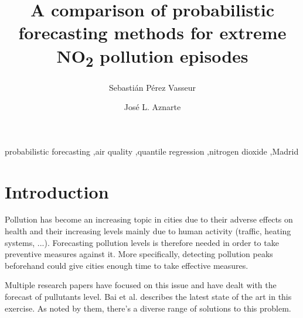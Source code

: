 \documentclass[a4paper,twocolumn,5p]{elsarticle}
\begin{document}
\newcommand{\no}{NO\textsubscript{2}\xspace}

\begin{frontmatter}

\title{A comparison of probabilistic forecasting methods for extreme \no pollution episodes}

\author{Sebasti\'an P\'erez Vasseur} 
\address{Artificial Intelligence Department\\Universidad Nacional de
  Educaci\'on a Distancia --- UNED\\c/ Juan del Rosal, 16, Madrid, Spain}

\author{Jos\'e L. Aznarte}
\address{Artificial Intelligence Department\\Universidad Nacional de
  Educaci\'on a Distancia --- UNED\\c/ Juan del Rosal, 16, Madrid, Spain}



\begin{abstract}

\end{abstract}

\begin{keyword}
probabilistic forecasting \sep air quality \sep quantile regression
\sep nitrogen dioxide \sep Madrid
\end{keyword}

\end{frontmatter}


\section{Introduction}
\label{sec:intro}

Pollution has become an increasing topic in cities due to their adverse 
effects on health and their increasing levels mainly due to human activity 
(traffic, heating systems, ...). Forecasting pollution levels is therefore needed 
in order to take preventive measures against it. More specifically, detecting pollution 
peaks beforehand could give cities enough time to take effective measures.

Multiple research papers have focused on this issue and have dealt with the
forecast of pullutants level. Bai et al. \cite{bai_air_2018} describes the latest 
state of the art in this exercise. As noted by them, there's a diverse range of 
solutions to this problem.
\end{document}
